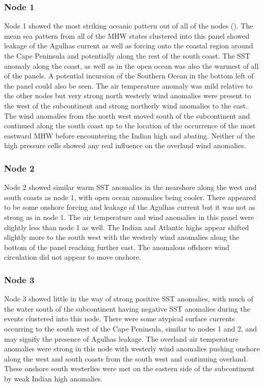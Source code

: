 \documentclass[a4paper,10pt,review]{elsarticle}
\begin{document}
\subsubsection{Node 1}
Node 1 showed the most striking oceanic pattern out of all of the nodes (). The mean sea pattern from all of the MHW states clustered into this panel showed leakage of the Agulhas current as well as forcing onto the coastal region around the Cape Peninsula and potentially along the rest of the south coast. The SST anomaly along the coast, as well as in the open ocean was also the warmest of all of the panels. A potential incursion of the Southern Ocean in the bottom left of the panel could also be seen. The air temperature anomaly was mild relative to the other nodes but very strong north westerly wind anomalies were present to the west of the subcontinent and strong northerly wind anomalies to the east. The wind anomalies from the north west moved south of the subcontinent and continued along the south coast up to the location of the occurrence of the most eastward MHW before encountering the Indian high and abating. Neither of the high pressure cells showed any real influence on the overland wind anomalies.

\subsubsection{Node 2}
Node 2 showed similar warm SST anomalies in the nearshore along the west and south coasts as node 1, with open ocean anomalies being cooler. There appeared to be some onshore forcing and leakage of the Agulhas current but it was not as strong as in node 1. The air temperature and wind anomalies in this panel were slightly less than node 1 as well. The Indian and Atlantic highs appear shifted slightly more to the south west with the westerly wind anomalies along the bottom of the panel reaching further east. The anomalous offshore wind circulation did not appear to move onshore.

\subsubsection{Node 3}
Node 3 showed little in the way of strong positive SST anomalies, with much of the water south of the subcontinent having negative SST anomalies during the events clustered into this node. There were some atypical surface currents occurring to the south west of the Cape Peninsula, similar to nodes 1 and 2, and may signify the presence of Agulhas leakage. The overland air temperature anomalies were strong in this node with westerly wind anomalies pushing onshore along the west and south coasts from the south west and continuing overland. These onshore south westerlies were met on the eastern side of the subcontinent by weak Indian high anomalies.
\end{document}
